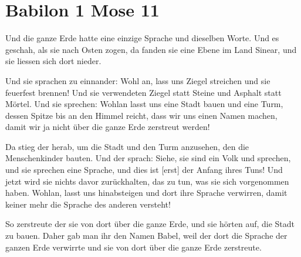 \documentclass[12pt]{../../inc/mybib}
\author{Lothar Schmid}
\begin{document}
\setlength{\baselineskip}{2.5\baselineskip}

\section{Babilon 1 Mose 11}

 Und die ganze Erde hatte eine einzige Sprache und dieselben Worte.  Und es geschah, als sie nach Osten zogen, da fanden sie eine Ebene im Land Sinear, und sie liessen sich dort nieder.

Und sie sprachen zu einnander: Wohl an, lass uns Ziegel streichen und sie feuerfest brennen! Und sie verwendeten Ziegel statt Steine und Asphalt statt Mörtel. Und sie sprechen: Wohlan lasst uns eine Stadt bauen und eine Turm, dessen Spitze bis an den Himmel reicht, dass wir uns einen Namen machen, damit wir ja nicht über die ganze Erde zerstreut werden!

Da stieg der \herr herab, um die Stadt und den Turm anzusehen, den die Menschenkinder bauten. Und der \herr sprach: Siehe, sie sind ein Volk und sprechen, und sie sprechen eine Sprache, und dies ist [erst] der Anfang ihres Tuns! Und jetzt wird sie nichts davor zurückhalten, das zu tun, was sie sich vorgenommen haben. Wohlan, lasst uns hinabsteigen und dort ihre Sprache verwirren, damit keiner mehr die Sprache des anderen versteht!

So zerstreute der \herr sie von dort über die ganze Erde, und sie hörten auf, die Stadt zu bauen. Daher gab man ihr den Namen Babel, weil der \herr dort die Sprache der ganzen Erde verwirrte und sie von dort über die ganze Erde zerstreute.
\end{document}
